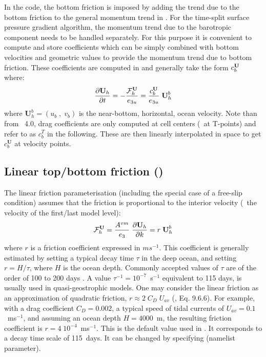 \documentclass[../main/NEMO_manual]{subfiles}
\begin{document}
In the code, the bottom friction is imposed by adding the trend due to the bottom friction to
 the general momentum trend in .
For the time-split surface pressure gradient algorithm, the momentum trend due to
the barotropic component needs to be handled separately.
For this purpose it is convenient to compute and store coefficients which can be simply combined with
bottom velocities and geometric values to provide the momentum trend due to bottom friction.
 These coefficients are computed in  and generally take the form $c_b^{\textbf U}$ where:
\begin{equation}
  \label{eq:ZDF_bfr_bdef}
  \frac{\partial {\textbf U_h}}{\partial t} =
  - \frac{{\cal F}^{\textbf U}_{h}}{e_{3u}} = \frac{c_b^{\textbf U}}{e_{3u}} \;{\textbf U}_h^b
\end{equation}
where $\textbf{U}_h^b = (u_b\;,\;v_b)$ is the near-bottom, horizontal, ocean velocity.
Note than from \NEMO\ 4.0, drag coefficients are only computed at cell centers (\ie\ at T-points) and refer to as $c_b^T$ in the following. These are then linearly interpolated in space to get $c_b^\textbf{U}$ at velocity points.

\subsection[Linear top/bottom friction (\forcode{ln_lin})]{Linear top/bottom friction (\protect{})}
\label{subsec:ZDF_drg_linear}

The linear friction parameterisation (including the special case of a free-slip condition) assumes that
the friction is proportional to the interior velocity (\ie\ the velocity of the first/last model level):
\[
  {\cal F}_h^\textbf{U} = \frac{A^{vm}}{e_3} \; \frac{\partial \textbf{U}_h}{\partial k} = r \; \textbf{U}_h^b
\]
where $r$ is a friction coefficient expressed in $m s^{-1}$.
This coefficient is generally estimated by setting a typical decay time $\tau$ in the deep ocean,
and setting $r = H / \tau$, where $H$ is the ocean depth.
Commonly accepted values of $\tau$ are of the order of 100 to 200 days \citep{weatherly_JMR84}.
A value $\tau^{-1} = 10^{-7}$~s$^{-1}$ equivalent to 115 days, is usually used in quasi-geostrophic models.
One may consider the linear friction as an approximation of quadratic friction, $r \approx 2\;C_D\;U_{av}$
(\citet{gill_bk82}, Eq. 9.6.6).
For example, with a drag coefficient $C_D = 0.002$, a typical speed of tidal currents of $U_{av} =0.1$~m\;s$^{-1}$,
and assuming an ocean depth $H = 4000$~m, the resulting friction coefficient is $r = 4\;10^{-4}$~m\;s$^{-1}$.
This is the default value used in \NEMO. It corresponds to a decay time scale of 115~days.
It can be changed by specifying  (namelist parameter).
\end{document}
